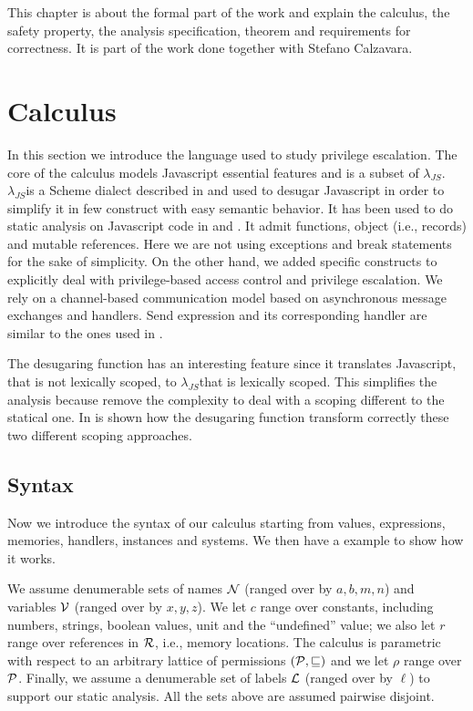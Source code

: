 \newcommand{\ljs}{$\lambda_{JS}$}
This chapter is about the formal part of the work and explain the calculus, the safety property, the analysis specification, theorem and requirements for correctness. It is part of the work done together with Stefano Calzavara.

\section{Calculus}
\label{sec:Calculus}
In this section we introduce the language used to study privilege escalation. The core of the calculus models Javascript essential features and is a subset of \ljs. \ljs is a Scheme dialect described in \cite{LambdaJS} and used to desugar Javascript in order to simplify it in few construct with easy semantic behavior. It has been used to do static analysis on Javascript code in \cite{Strobe} and \cite{LambdaJSMightVanHorn}. It admit functions, object (i.e., records) and mutable references. Here we are not using exceptions and break statements for the sake of simplicity. On the other hand, we added specific constructs to explicitly deal with privilege-based access control and privilege escalation. We rely on a channel-based communication model based on asynchronous message exchanges and handlers. Send expression and its corresponding handler are similar to the ones used in \cite{Lintent}. 

The desugaring function has an interesting feature since it translates Javascript, that is not lexically scoped, to \ljs that is lexically scoped. This simplifies the analysis because remove the complexity to deal with a scoping different to the statical one. In \cite{LambdaJS} is shown how the desugaring function transform correctly these two different scoping approaches.

\subsection{Syntax}
Now we introduce the syntax of our calculus starting from values, expressions, memories, handlers, instances and systems. We then have a example to show how it works.

We assume denumerable sets of names $\mathcal{N}$ (ranged over by $a,b,m,n$) and variables $\mathcal{V}$ (ranged over by $x,y,z$). We let $c$ range over constants, including numbers, strings, boolean values, unit and the ``undefined'' value; we also let $r$ range over references in $\mathcal{R}$, i.e., memory locations. The calculus is parametric with respect to an arbitrary lattice of permissions $(\mathcal{P},\sqsubseteq)$ and we let $\rho$ range over $\mathcal{P}$. Finally, we assume a denumerable set of labels ${\mathcal L}$ (ranged over by $\ell$) to support our static analysis. All the sets above are assumed pairwise disjoint.

